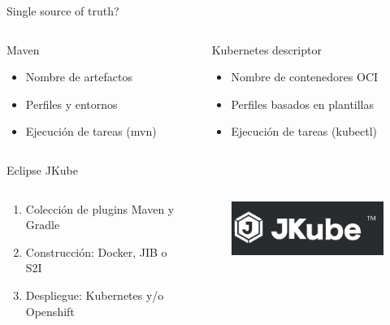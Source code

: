 \documentclass[aspectratio=169]{beamer}
\begin{document}
\begin{frame}[fragile]{Single source of truth?}
    \begin{columns}
        \begin{column}{0.5\textwidth}
        Maven
           	\begin{itemize}
           		\item Nombre de artefactos
           		\item Perfiles y entornos
           		\item Ejecución de tareas (mvn)
           	\end{itemize}
        \end{column}
        \begin{column}{0.5\textwidth}  %
        Kubernetes descriptor
          \begin{itemize}
    		\item Nombre de contenedores OCI
       		\item Perfiles basados en plantillas
       		\item Ejecución de tareas (kubectl)
        	\end{itemize}
        \end{column}
    \end{columns}
\end{frame}




\begin{frame}{Eclipse JKube}
	\begin{columns}[T] %
		
		\begin{column}[T]{4cm} %
		\begin{enumerate}
			\item Colección de plugins Maven y Gradle
			\item Construcción: Docker, JIB o S2I
            \item Despliegue: Kubernetes y/o Openshift
		\end{enumerate}
		\end{column}
		\begin{column}[T]{6cm} %
\begin{figure}
\centering
\includegraphics[width=0.7\linewidth]{Images/jkube}
\end{figure}
			
		\end{column}
	\end{columns}
\end{frame}
\end{document}
